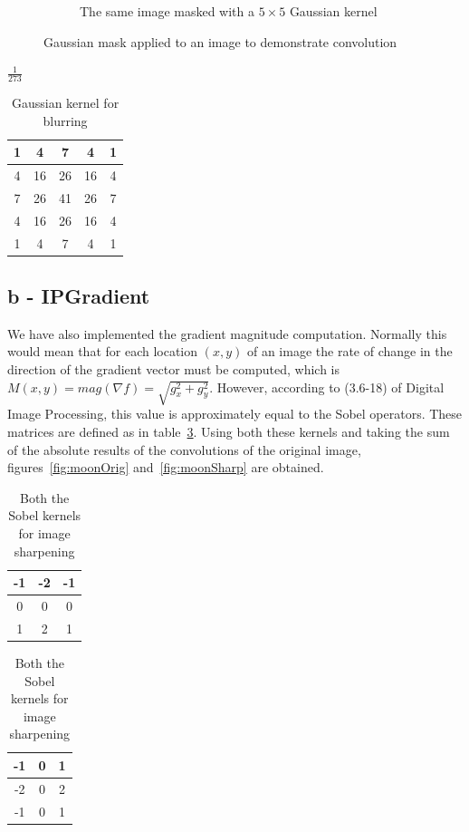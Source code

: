 \begin{figure}[!htb]
\begin{subfigure}[b]{0.49\linewidth}
  \caption{The same image masked with a \(5\times5\) Gaussian kernel}
  \label{fig:blur}
 \end{subfigure}
 \caption{Gaussian mask applied to an image to demonstrate convolution}
\end{figure}
\begin{table}[!htb]
\begin{center}
$\frac{1}{273}$
\begin{tabular}{|c|c|c|c|c|}\hline
1 & 4 & 7 & 4 & 1\\ \hline
4 &  16 &  26 &  16 &  4 \\ \hline
7 &  26 &  41 &  26 &  7\\ \hline
4 &  16 &  26 &  16 &  4\\ \hline
1 &  4 &  7 &  4 &  1 \\ \hline
\end{tabular}

\caption{Gaussian kernel for blurring}
\label{tbl:gauss}
\end{center}
\end{table}

\subsection*{b - IPGradient}
We have also implemented the gradient magnitude computation. Normally this would mean that for each location $(x, y)$ of an image the rate of change in the direction of the gradient vector must be computed, which is $M(x, y) = mag(\nabla f) = \sqrt{g_x ^2 + g_y ^2}$. However, according to (3.6-18) of Digital Image Processing, this value is approximately equal to the Sobel operators. These matrices are defined as in table~\ref{tbl:sobel}. Using both these kernels and taking the sum of the absolute results of the convolutions of the original image, figures~\ref{fig:moonOrig} and~\ref{fig:moonSharp} are obtained. 
\begin{table}[!htb]
\begin{center}
\begin{tabular}{|c|c|c|}\hline
-1 & -2 & -1 \\ \hline
0 & 0 & 0 \\ \hline
1 & 2 & 1 \\ \hline
\end{tabular}
\begin{tabular}{|c|c|c|}\hline
-1 & 0 & 1 \\ \hline
-2 & 0 & 2 \\ \hline
-1 & 0 & 1 \\ \hline
\end{tabular}

\caption{Both the Sobel kernels for image sharpening}
\label{tbl:sobel}
\end{center}
\end{table}

